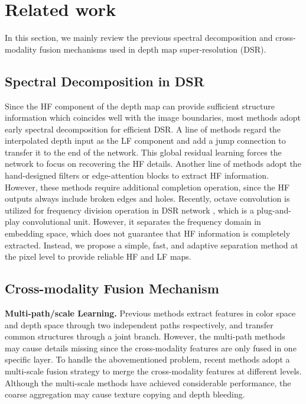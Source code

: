 \documentclass[letterpaper]{article} %
\begin{document}
\section{Related work}
In this section, we mainly review the previous spectral decomposition and cross-modality fusion mechanisms used in depth map super-resolution (DSR). 

\subsection{Spectral Decomposition in DSR}
Since the HF component of the depth map can provide sufficient structure information which coincides well with the image boundaries, most methods adopt early spectral decomposition for efficient DSR. A line of methods \cite{makarov2017semi,xiao2018joint,li2019joint,zuo2019multi,2019Hierarchical} regard the interpolated depth input as the LF component and add a jump connection to transfer it to the end of the network. This global residual learning forces the network to focus on recovering the HF details. Another line of methods adopt the hand-designed filters \cite{2016Multi,yang2017depth} or edge-attention \cite{ye2018depthF,chen2018single} blocks to extract HF information. However, these methods require additional completion operation, since the HF outputs always include broken edges and holes. Recently, octave convolution \cite{chen2019drop} is utilized for frequency division operation in DSR network \cite{he2021towards}, which is a plug-and-play convolutional unit. However, it separates the frequency domain in embedding space, which does not guarantee that HF information is completely extracted. Instead, we propose a simple, fast, and adaptive separation method at the pixel level to provide reliable HF and LF maps.

\subsection{Cross-modality Fusion Mechanism}

\textbf{Multi-path/scale Learning.}
Previous methods \cite{li2016deep,lutio2019guided,zhu2018co,chen2018single,hao2019multi,su2019pixel} extract features in color space and depth space through two independent paths respectively, and transfer common structures through a joint branch. However, the multi-path methods may cause details missing since the cross-modality features are only fused in one specific layer. To handle the abovementioned problem, recent methods \cite{2016Multi,2019Hierarchical,he2021towards,zuo2019multi,zuo2019residual,yan2022learning} adopt a multi-scale fusion strategy to merge the cross-modality features at different levels. Although the multi-scale methods have achieved considerable performance, the coarse aggregation may cause texture copying and depth bleeding.
\end{document}
